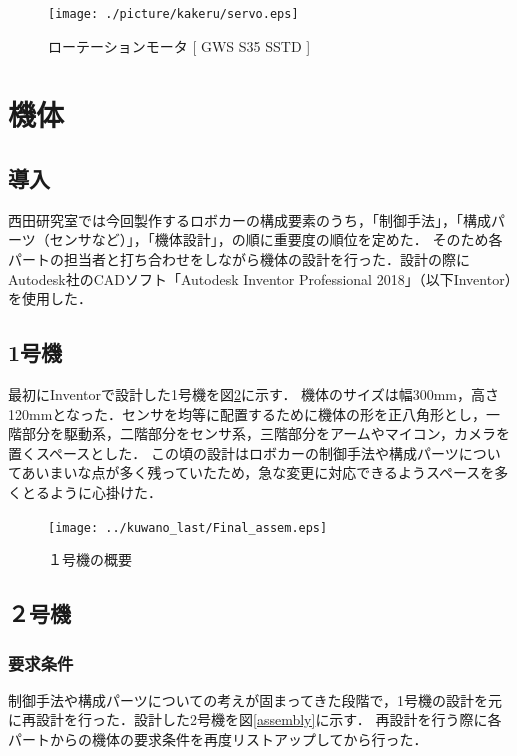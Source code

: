 \documentclass[11pt,a4]{jsarticle}
\begin{document}
\begin{figure}[h]
  \centering
    \texttt{[image: ./picture/kakeru/servo.eps]}
    \caption{ローテーションモータ [ GWS S35 SSTD ]}
  \label{servo}
\end{figure}

\newpage

\section{機体}

\subsection{導入}
西田研究室では今回製作するロボカーの構成要素のうち，「制御手法」，「構成パーツ（センサなど）」，「機体設計」，の順に重要度の順位を定めた．
そのため各パートの担当者と打ち合わせをしながら機体の設計を行った．設計の際にAutodesk社のCADソフト「Autodesk Inventor Professional 2018」（以下Inventor）を使用した．

\subsection{1号機}
最初にInventorで設計した1号機を図\ref{assem}に示す．
機体のサイズは幅300mm，高さ120mmとなった．センサを均等に配置するために機体の形を正八角形とし，一階部分を駆動系，二階部分をセンサ系，三階部分をアームやマイコン，カメラを置くスペースとした．
この頃の設計はロボカーの制御手法や構成パーツについてあいまいな点が多く残っていたため，急な変更に対応できるようスペースを多くとるように心掛けた．

\begin{figure}[h]
\begin{center}
  \texttt{[image: ../kuwano\_last/Final\_assem.eps]}
\end{center}
\caption{１号機の概要}
\label{assem}
\end{figure}

\newpage
\subsection{２号機}

\subsubsection{要求条件}
制御手法や構成パーツについての考えが固まってきた段階で，1号機の設計を元に再設計を行った．設計した2号機を図\ref{assembly}に示す．
再設計を行う際に各パートからの機体の要求条件を再度リストアップしてから行った．
\end{document}
